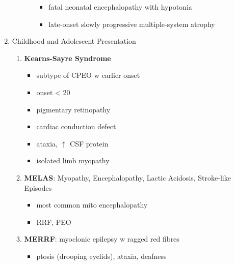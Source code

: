 \documentclass{scrartcl}
\begin{document}
\begin{enumerate}
\begin{enumerate}
\begin{itemize}
\begin{itemize}
\item fatal neonatal encephalopathy with hypotonia
\item late-onset slowly progressive multiple-system atrophy
\end{itemize}
\end{itemize}
\end{enumerate}
\item Childhood and Adolescent Presentation
\label{sec:org47bbe71}
\begin{enumerate}
\item \textbf{Kearns-Sayre Syndrome}
\label{sec:org5c1b690}
\begin{itemize}
\item subtype of CPEO w earlier onset
\item onset \textless{} 20
\item pigmentary retinopathy
\item cardiac conduction defect
\item ataxia, \(\uparrow\) CSF protein
\item isolated limb myopathy
\end{itemize}
\item \textbf{MELAS}: Myopathy, Encephalopathy, Lactic Acidosis, Stroke-like Episodes
\label{sec:orgc77151d}
\begin{itemize}
\item most common mito encephalopathy
\item RRF, PEO
\end{itemize}
\item \textbf{MERRF}: myoclonic epilepsy w ragged red fibres
\label{sec:org24620d6}
\begin{itemize}
\item ptosis (drooping eyelids), ataxia, deafness
\begin{description}

\end{description}
\end{itemize}
\end{enumerate}
\end{enumerate}
\end{document}

